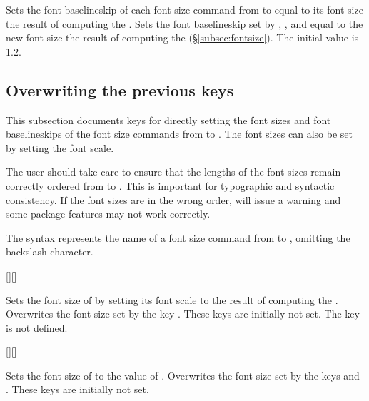 \documentclass{beery}
\begin{document}
Sets the font baselineskip of each font size command from  to  equal to its font size \texttimes{} the result of computing the .
Sets the font baselineskip set by , , and  equal to the new font size \texttimes{} the result of computing the  (\S\ref{subsec:fontsize}).
The initial value is \num{1.2}.

\subsection{Overwriting the previous keys}
\label{subsec:overwriting}

This subsection documents keys for directly setting the font sizes and font baselineskips of the font size commands from  to .
The font sizes can also be set by setting the font scale.

The user should take care to ensure that the lengths of the font sizes remain correctly ordered from  to .
This is important for typographic and syntactic consistency.
If the font sizes are in the wrong order,  will issue a warning and some package features may not work correctly.

The syntax  represents the name of a font size command from  to , omitting the backslash character.

\begin{displaycode}
  [][]
\end{displaycode}

Sets the font size of  by setting its font scale to the result of computing the .
Overwrites the font size set by the key .
These keys are initially not set.
The key  is not defined.

\begin{displaycode}
  [][]
\end{displaycode}

Sets the font size of  to the value of .
Overwrites the font size set by the keys  and .
These keys are initially not set.
\end{document}
